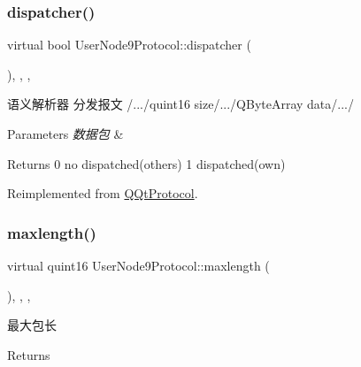 \subsubsection{\texorpdfstring{dispatcher()}{dispatcher()}}
{\footnotesize\ttfamily virtual bool User\+Node9\+Protocol\+::dispatcher (\begin{DoxyParamCaption}\item[{const Q\+Byte\+Array \&}]{ }\end{DoxyParamCaption})\hspace{0.3cm}{\ttfamily [inline]}, {\ttfamily [override]}, {\ttfamily [protected]}, {\ttfamily [virtual]}}



语义解析器 分发报文 /.../quint16 size/.../\+Q\+Byte\+Array data/.../ 


\begin{DoxyParams}{Parameters}
{\em 数据包} & \\
\hline
\end{DoxyParams}
\begin{DoxyReturn}{Returns}
0 no dispatched(others) 1 dispatched(own) 
\end{DoxyReturn}


Reimplemented from \mbox{\hyperlink{class_q_qt_protocol_a35a69c4b89c8cf7459038f40d75e0dc9}{Q\+Qt\+Protocol}}.

\mbox{\label{class_user_node9_protocol_aab13ff1d10583bf493cf62cecdbf8bf9}} 
\subsubsection{\texorpdfstring{maxlength()}{maxlength()}}
{\footnotesize\ttfamily virtual quint16 User\+Node9\+Protocol\+::maxlength (\begin{DoxyParamCaption}{ }\end{DoxyParamCaption})\hspace{0.3cm}{\ttfamily [inline]}, {\ttfamily [override]}, {\ttfamily [protected]}, {\ttfamily [virtual]}}



最大包长 

\begin{DoxyReturn}{Returns}

\end{DoxyReturn}


